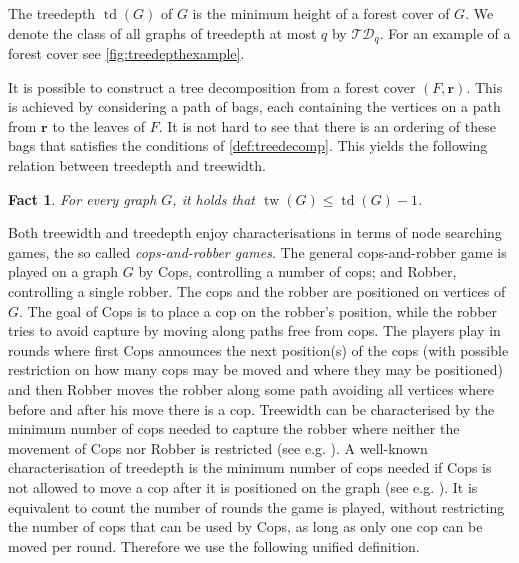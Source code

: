 \documentclass[10pt,a4paper]{article}
\newcommand{\TD}{\ensuremath{\mathcal{TD}}}
\newcommand{\tup}[1]{\ensuremath{\boldsymbol{#1}}}
\DeclareMathOperator{\tw}{tw}
\DeclareMathOperator{\td}{td}
\newtheorem{fact}[definition]{Fact}
\begin{document}
The treedepth $\td(G)$ of $G$ is the minimum height of a forest cover of $G$. We denote the class of all graphs of treedepth at most $q$ by $\TD_q$. For an example of a forest cover see \cref{fig:treedepthexample}.

It is possible to construct a tree decomposition from a forest cover $(F, \tup{r})$. This is achieved by considering a path of bags, each containing the vertices on a path from $\tup{r}$ to the leaves of $F$. It is not hard to see that there is an ordering of these bags that satisfies the conditions of \cref{def:treedecomp}.
This yields the following relation between treedepth and treewidth.

\begin{fact}
  For every graph $G$, it holds that $\tw(G) \leq \td(G) - 1$.
\end{fact}

Both treewidth and treedepth enjoy characterisations in terms of node searching games, the so called \emph{cops-and-robber games}.
The general cops-and-robber game is played on a graph $G$ by Cops, controlling a number of cops; and Robber, controlling a single robber.
The cops and the robber are positioned on vertices of $G$.
The goal of Cops is to place a cop on the robber's position, while the robber tries to avoid capture by moving along paths free from cops.
The players play in rounds where first Cops announces the next position(s) of the cops (with possible restriction on how many cops may be moved and where they may be positioned) and then Robber moves the robber along some path avoiding all vertices where before and after his move there is a cop.
Treewidth can be characterised by the minimum number of cops needed to capture the robber where neither the movement of Cops nor Robber is restricted (see e.g. \cite{seymour_graph_1993}).
A well-known characterisation of treedepth is the minimum number of cops needed if Cops is not allowed to move a cop after it is positioned on the graph (see e.g. \cite{giannopoulou_lifo-search_2012}).
It is equivalent to count the number of rounds the game is played, without restricting the number of cops that can be used by Cops, as long as only one cop can be moved per round.
Therefore we use the following unified definition.
\end{document}
